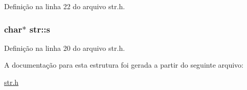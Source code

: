 Definição na linha 22 do arquivo str.h.

\hypertarget{structstr_a1fc4ce5d6a790001388349ca5b735383}{
\subsubsection[{s}]{\setlength{\rightskip}{0pt plus 5cm}char$\ast$ {\bf str::s}}}
\label{structstr_a1fc4ce5d6a790001388349ca5b735383}


Definição na linha 20 do arquivo str.h.



A documentação para esta estrutura foi gerada a partir do seguinte arquivo:\begin{DoxyCompactItemize}
\item 
\hyperlink{str_8h}{str.h}\end{DoxyCompactItemize}
